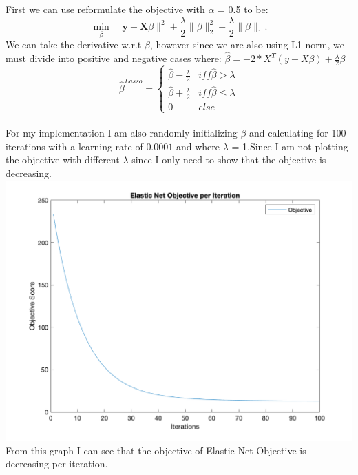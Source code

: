 \documentclass[11pt]{article}
\newcommand{\mtx}[1]{\mathbf{#1}}
\newcommand{\vct}[1]{\mathbf{#1}}
\def \mX {\mtx{X}}
\def \vy {\vct{y}}
\begin{document}
\begin{enumerate}
First we can use reformulate the objective with $\alpha$ = 0.5 to be: 
\begin{equation}
\min_{\beta} \|\vy-\mX\beta\|^2+ \frac{\lambda}{2}\|\beta\|^2_2+\frac{\lambda}{2}\|\beta\|_1.
\end{equation}
We can take the derivative w.r.t $\beta$, however since we are also using L1 norm, we must divide into positive and negative cases where:
$\hat{\beta} = -2*X^T(y - X\beta) + \frac{\lambda}{2} \beta$\\
\begin{equation}
\hat{\beta}^{Lasso} = \left\{ \begin{array}{ll}
            \hat{\beta} - \frac{\lambda}{2} &  iff \hat{\beta} > \lambda\\
            \hat{\beta} + \frac{\lambda}{2} &  iff \hat{\beta} \leq \lambda\\
            0 & else
        \end{array} \right.
\end{equation}\\
For my implementation I am also randomly initializing $\beta$ and calculating for 100 iterations with a learning rate of $0.0001$ and where $\lambda$ = 1.Since I am not plotting the objective with different $\lambda$ since I only need to show that the objective is decreasing. \\
\includegraphics[scale=.95]{elastic_net_ob.png}\\
From this graph I can see that the objective of Elastic Net Objective is decreasing per iteration.
\end{enumerate}
\end{document}
